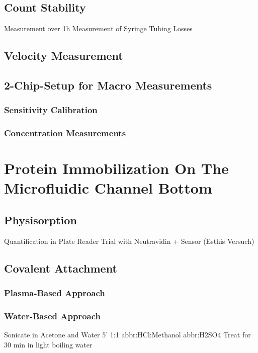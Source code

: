 \subsection{Count Stability}
Measurement over 1h
Measurement of Syringe Tubing Losses

\subsection{Velocity Measurement}

\subsection{2-Chip-Setup for Macro Measurements}

\subsubsection{Sensitivity Calibration}

\subsubsection{Concentration Measurements}

\section{Protein Immobilization On The Microfluidic Channel Bottom}

\subsection{Physisorption}
Quantification in Plate Reader
Trial with Neutravidin + Sensor (Esthis Versuch)

\subsection{Covalent Attachment}

\subsubsection{Plasma-Based Approach}

\subsubsection{Water-Based Approach}
Sonicate in Acetone and Water 5'
1:1 \gls{abbr:HCl}:Methanol
\gls{abbr:H2SO4}
Treat for 30 min in light boiling water
